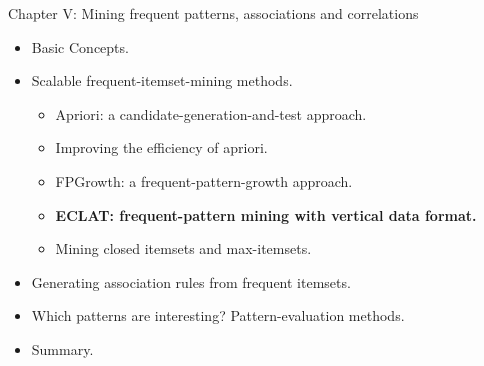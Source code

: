 \documentclass[aspectratio=169,t,xcolor=dvipsnames]{beamer}
\begin{document}
  {
    \begin{frame}{Chapter V: Mining frequent patterns, associations and correlations}
        \begin{itemize}
            \item Basic Concepts.
            \item Scalable frequent-itemset-mining methods.
            \begin{itemize}
              \item Apriori: a candidate-generation-and-test approach.
              \item Improving the efficiency of apriori.
              \item FPGrowth:  a frequent-pattern-growth approach.
              \item \textbf{ECLAT: frequent-pattern mining with vertical data format.}
              \item Mining closed itemsets and max-itemsets.
            \end{itemize}
            \item Generating association rules from frequent itemsets.
            \item Which patterns are interesting? Pattern-evaluation methods.
            \item Summary.
        \end{itemize}
    \end{frame}
  }
\end{document}
